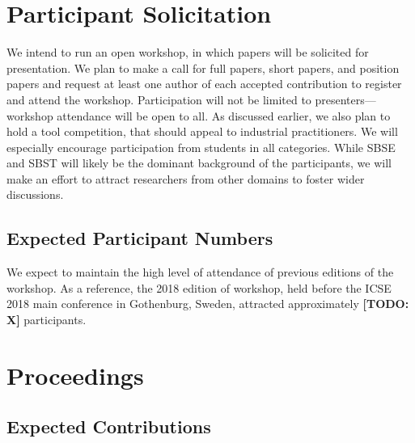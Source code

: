 \documentclass[10pt,conference]{IEEEtran}
\newcommand{\TODO}[1]{\textbf{\textcolor{ScarletRed}{[TODO: #1]}}\xspace}
\newcommand{\TODO}[1]{}
\begin{document}
\section{Participant Solicitation}

We intend to run an open workshop, in which papers will be solicited
for presentation.  We plan to make a call for full papers, short
papers, and position papers and request at least one author of each
accepted contribution to register and attend the workshop.
Participation will not be limited to presenters---workshop attendance
will be open to all. As discussed earlier, we also plan to hold a tool
competition, that should appeal to industrial practitioners. We will
especially encourage participation from students in all
categories. While SBSE and SBST will likely be the dominant background
of the participants, we will make an effort to attract researchers
from other domains to foster wider discussions.

\subsection{Expected Participant Numbers}
\label{sec:expectedparticipants}


We expect to maintain the high level of attendance of previous
editions of the workshop. As a reference, the 2018 edition of
workshop, held before the ICSE 2018 main conference in Gothenburg,
Sweden, attracted approximately \TODO{X} participants.

\section{Proceedings}

\subsection{Expected Contributions}
\end{document}
